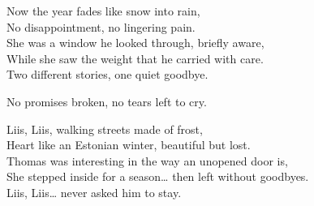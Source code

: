 \begin{lyrics}
Now the year fades like snow into rain,\\
No disappointment, no lingering pain.\\
She was a window he looked through, briefly aware,\\
While she saw the weight that he carried with care.\\
Two different stories, one quiet goodbye.

No promises broken, no tears left to cry.

Liis, Liis, walking streets made of frost,\\
Heart like an Estonian winter, beautiful but lost.\\
Thomas was interesting in the way an unopened door is,\\
She stepped inside for a season… then left without goodbyes.\\
Liis, Liis… never asked him to stay.
\end{lyrics}

